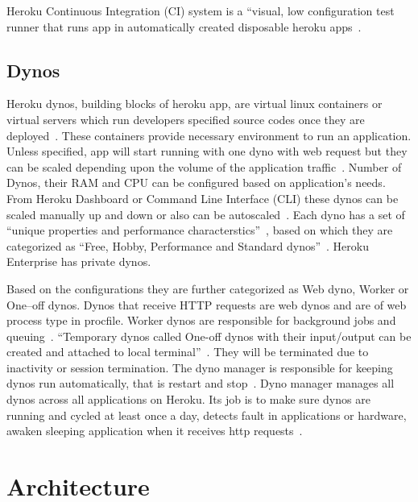  Heroku Continuous Integration (CI) system is a ``visual, low configuration
 test runner that runs app in automatically created disposable 
 heroku apps~\cite{hid-sp18-415-www-heroku-ci}.


\subsection{Dynos}

 Heroku dynos, building blocks of heroku app, are virtual linux containers or
 virtual servers which run developers specified source codes once they are 
 deployed~\cite{hid-sp18-415-www-heroku-dynos}. These containers provide necessary
 environment
 to run an application. Unless specified, app will start running with one dyno 
 with  web request but they can be scaled depending upon the volume of the 
 application traffic~\cite{hid-sp18-415-www-heroku-dynos}. Number of Dynos, their RAM and 
 CPU can be 
 configured based on application's needs. From Heroku Dashboard or Command Line
 Interface (CLI) these dynos can be scaled manually up and down or also can be 
 autoscaled~\cite{hid-sp18-415-www-heroku-dynos}. Each dyno has a set of 
 ``unique properties and performance characterstics''~\cite{hid-sp18-415-www-heroku-dynos}, 
 based on which they are categorized as ``Free, Hobby, Performance and Standard 
 dynos''~\cite{hid-sp18-415-www-devcenter-dynos}. Heroku Enterprise has private dynos.

 Based on the configurations they are further
 categorized as Web dyno, Worker or One--off dynos. Dynos that receive HTTP
 requests are web dynos and are of web process type in procfile. Worker dynos
 are responsible for background jobs and queuing~\cite{hid-sp18-415-www-devcenter-dynos}.
 ``Temporary dynos called One-off dynos with their input/output can be created 
 and attached to local terminal''~\cite{hid-sp18-415-www-how-heroku-works}. They will be 
 terminated due to inactivity or session termination.
 The dyno manager is responsible for keeping
 dynos run automatically, that is restart and stop~\cite{hid-sp18-415-www-devcenter-dynos}. 
 Dyno manager manages all dynos across all applications on Heroku. Its job is 
to make sure dynos are running and cycled at least once a day, detects fault
 in applications or hardware, awaken sleeping application when it receives http
requests~\cite{hid-sp18-415-www-how-heroku-works}. 


 \section{Architecture}

